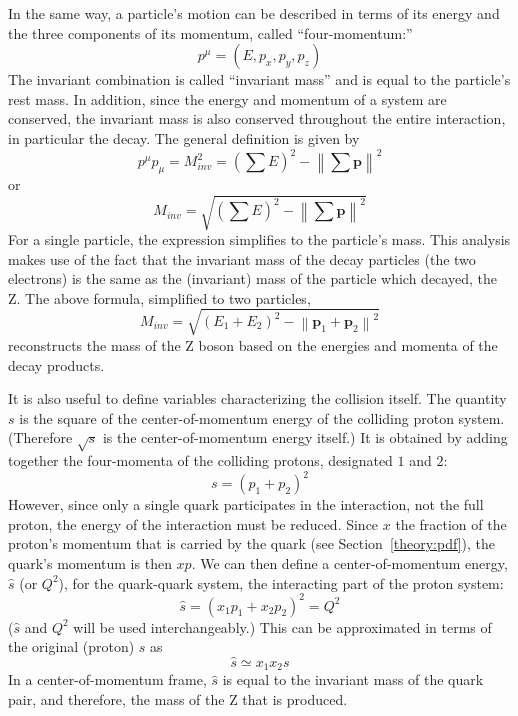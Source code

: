 In the same way, a particle's motion can be described 
in terms of its energy and the three components of 
its momentum, called ``four-momentum:''
\[
p^{\mu} = (E, p_x, p_y, p_z)
\]
The invariant combination is called ``invariant mass'' 
and is equal to the particle's rest mass.  
%
%
In addition, since the energy and momentum 
of a system are conserved, 
the invariant mass is also conserved 
throughout the entire interaction, 
in particular the decay.  
The general definition is given by 
\[
p^{\mu}p_{\mu} = M_{inv}^2 = \left( \sum E \right)^2 - \left\| \sum \mathbf{p} \right\|^2
\]
or
\[
M_{inv} = \sqrt{ \left( \sum E \right)^2 - \left\| \sum \mathbf{p} \right\|^2 }
\]
For a single particle, the expression simplifies 
to the particle's mass.  
This analysis makes use of the fact that the 
invariant mass of the decay particles 
(the two electrons) 
is the same as the (invariant) mass of the 
particle which decayed, the Z.  
The above formula, simplified to two particles, 
\[
M_{inv} = \sqrt{ \left(E_1 + E_2\right)^2 - \left\|\mathbf{p}_1 + \mathbf{p}_2\right\|^2 }
\]
reconstructs the mass of the Z boson 
based on the energies and momenta 
of the decay products.  

It is also useful to define variables 
characterizing the collision itself.  
The quantity $s$ is the square of the center-of-momentum 
energy of the colliding proton system.  
(Therefore $\sqrt{s}$ is the center-of-momentum 
energy itself.)  
It is obtained by adding together the four-momenta 
of the colliding protons, designated $1$ and $2$: %
\[
s = (p_1 + p_2)^2
\]
However, since only a single quark participates 
in the interaction, not the full proton, 
the energy of the interaction must be reduced.  
Since $x$ the fraction of the proton's momentum that is carried 
by the quark (see Section~\ref{theory:pdf}), %
the 
quark's momentum is then $xp$.  
We can then define a center-of-momentum energy, 
$\hat{s}$ (or $Q^2$), 
for the quark-quark system, 
the interacting part of the proton system: 
\[
\hat{s} = (x_1 p_1 + x_2 p_2)^2 = Q^2
\]
($\hat{s}$ and $Q^2$ will be used interchangeably.)  
This can be approximated in terms of the original 
(proton) $s$ as 
\[
\hat{s} \simeq x_1 x_2 s
\]
In a center-of-momentum frame, $\hat{s}$ is equal 
to the invariant mass of the quark pair, 
and therefore, the mass of the Z that is produced.  



